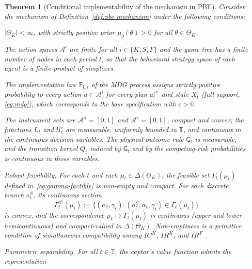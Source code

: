 \documentclass[ecta,nameyear,draft]{econsocart}
\theoremstyle{plain}
\newtheorem{theorem}{Theorem}
\theoremstyle{definition}
\newcommand{\ThetaK}{\Theta_K}
\newcommand{\1}{\mathbf{1}}
\newcommand{\ProbI}[1]{\mathbb{P}_{\mathrm{I},#1}}
\begin{document}
\begin{theorem}[Conditional implementability of the mechanism in PBE]\label{thm:ebp-implementabilidad}
\normalfont
Consider the mechanism of Definition~\ref{def:pbe-mechanism} under the following conditions:
\begin{list}{}{\setlength{\labelwidth}{2.6em}\setlength{\labelsep}{0.7em}\setlength{\leftmargin}{3.3em}\setlength{\itemindent}{0pt}\setlength{\listparindent}{0pt}\setlength{\parsep}{0pt}\setlength{\itemsep}{0.35\baselineskip}}
  \item[\textup{(i)}] $|\ThetaK|<\infty$, with strictly positive prior $\mu_0(\theta)>0$ for all $\theta\in\ThetaK$.
  \item[\textup{(ii)}] The action spaces $\mathcal{A}^i$ are finite for all $i\in\{K,S,F\}$ and the game tree has a finite number of nodes in each period $t$, so that the behavioral strategy space of each agent is a finite product of simplexes.
  \item[\textup{(iii)}] The implementation law $\ProbI{i}$ of the MDG process assigns strictly positive probability to every action $a\in\mathcal{A}^i$ for every plan $a_t^{i\ast}$ and state $X_t$ \textup{(}full support, \eqref{eq:mdg}\textup{)}, which corresponds to the base specification with $\underline{c}>0$.
  \item[\textup{(iv)}] The instrument sets are $\mathcal{A}^{\alpha}=[0,1]$ and $\mathcal{A}^{\gamma}=[0,1]$, compact and convex; the functions $L_t$ and $\mathcal{U}_t^i$ are measurable, uniformly bounded in $\mathbb{T}$, and continuous in the continuous decision variables. The physical outcome rule $\mathsf{G}_t$ is measurable, and the transition kernel $Q_t$ induced by $\mathsf{G}_t$ and by the competing-risk probabilities is continuous in those variables.
  \item[\textup{(v)}] Robust feasibility. For each $t$ and each $\mu_t\in\Delta(\ThetaK)$, the feasible set $\Gamma_t(\mu_t)$ defined in~\eqref{eq:gamma-factible} is non-empty and compact. For each discrete branch $a_t^S$, its continuous section
  \[
  \Gamma_t^{a^S}(\mu_t):=\{(\alpha_t,\gamma_t):(a_t^S,\alpha_t,\gamma_t)\in\Gamma_t(\mu_t)\}
  \]
  is convex, and the correspondence $\mu_t\mapsto\Gamma_t(\mu_t)$ is continuous \textup{(}upper and lower hemicontinuous\textup{)} and compact-valued in $\Delta(\ThetaK)$. Non-emptiness is a primitive condition of simultaneous compatibility among $IC^K$, $IR^K$, and $IR^F$ \citep{KadanRenySwinkels2017}.
  \item[\textup{(vi)}] Parametric separability. For all $t\in\mathbb{T}$, the captor's value function admits the representation

\end{list}
\end{theorem}
\end{document}
